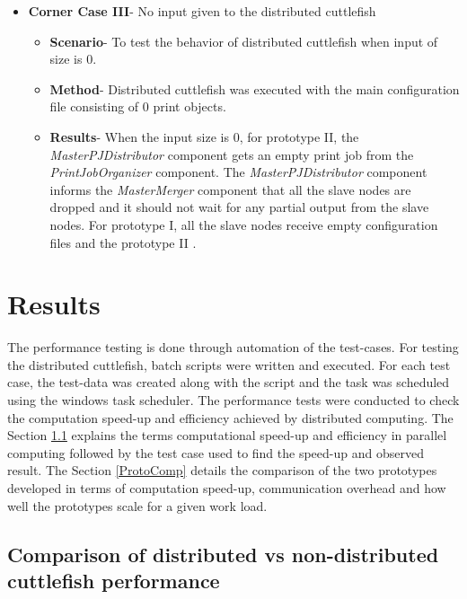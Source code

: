 \begin{enumerate}
\begin{itemize}
\item{\textbf{Corner Case III}- No input given to the distributed cuttlefish}
\begin{itemize}
\item{\textbf{Scenario}}- To test the behavior of distributed cuttlefish when input of size is 0.
\item{\textbf{Method}}- Distributed cuttlefish was executed with the main configuration file consisting of 0 print objects.
\item{\textbf{Results}}- When the input size is 0, for prototype II, the \textit{MasterPJDistributor} component gets an empty print job from the \textit{PrintJobOrganizer} component. The \textit{MasterPJDistributor} component informs the \textit{MasterMerger} component that all the slave nodes are dropped and it should not wait for any partial output from the slave nodes. For prototype I, all the slave nodes receive empty configuration files and the prototype II . 
\end{itemize}
\end{itemize}
\end{enumerate}

 
\section{Results} \label{PerformanceTests}

The performance testing is done through automation of the test-cases. For testing the distributed cuttlefish, batch scripts were written and executed. For each test case, the test-data was created along with the script and the task was scheduled using the windows task scheduler. The performance tests were conducted to check the computation speed-up and efficiency achieved by distributed computing. The Section \ref{DistvsNonDist} explains the terms computational speed-up and efficiency in parallel computing followed by the test case used to find the speed-up and observed result. The Section \ref{ProtoComp} details the comparison of the two prototypes developed in terms of computation speed-up, communication overhead and how well the prototypes scale for a given work load.

\subsection{Comparison of distributed vs non-distributed cuttlefish performance} \label{DistvsNonDist}

